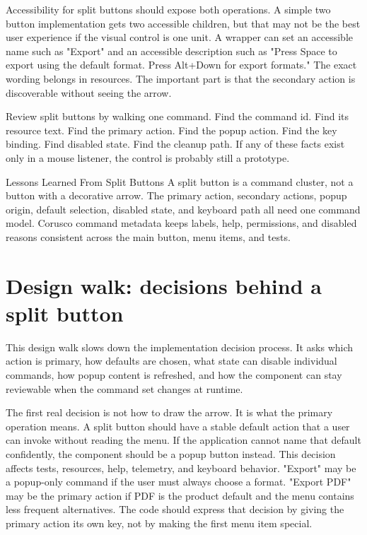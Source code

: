 Accessibility for split buttons should expose both operations. A simple two button
implementation gets two accessible children, but that may not be the best user
experience if the visual control is one unit. A wrapper can set an accessible name such
as "Export" and an accessible description such as "Press Space to export using the
default format. Press Alt+Down for export formats." The exact wording belongs in
resources. The important part is that the secondary action is discoverable without
seeing the arrow.

Review split buttons by walking one command. Find the command id. Find its resource
text. Find the primary action. Find the popup action. Find the key binding. Find
disabled state. Find the cleanup path. If any of these facts exist only in a mouse
listener, the control is probably still a prototype.

\begin{principlebox}{Lessons Learned From Split Buttons}
A split button is a command cluster, not a button with a decorative arrow. The
primary action, secondary actions, popup origin, default selection, disabled
state, and keyboard path all need one command model. Corusco command metadata
keeps labels, help, permissions, and disabled reasons consistent across the main
button, menu items, and tests.
\end{principlebox}

\section{Design walk: decisions behind a split button}

\begin{roadmapbox}
This design walk slows down the implementation decision process. It asks which
action is primary, how defaults are chosen, what state can disable individual
commands, how popup content is refreshed, and how the component can stay
reviewable when the command set changes at runtime.
\end{roadmapbox}

The first real decision is not how to draw the arrow. It is what the primary operation
means. A split button should have a stable default action that a user can invoke without
reading the menu. If the application cannot name that default confidently, the component
should be a popup button instead. This decision affects tests, resources, help,
telemetry, and keyboard behavior. "Export" may be a popup-only command if the user must
always choose a format. "Export PDF" may be the primary action if PDF is the product
default and the menu contains less frequent alternatives. The code should express that
decision by giving the primary action its own key, not by making the first menu item
special.

